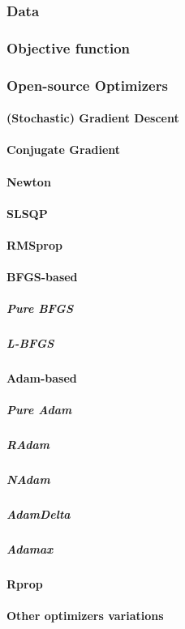 \subsubsection{Data}
\subsubsection{Objective function}
\subsubsection{Open-source Optimizers}
\paragraph{(Stochastic) Gradient Descent}
\paragraph{Conjugate Gradient}
\paragraph{Newton}
\paragraph{SLSQP}
\paragraph{RMSprop}
\paragraph{BFGS-based}
\subparagraph{Pure BFGS}
\subparagraph{L-BFGS}
\paragraph{Adam-based}
\subparagraph{Pure Adam}
\subparagraph{RAdam}
\subparagraph{NAdam}
\subparagraph{AdamDelta}
\subparagraph{Adamax}
\paragraph{Rprop}
\paragraph{Other optimizers variations}

